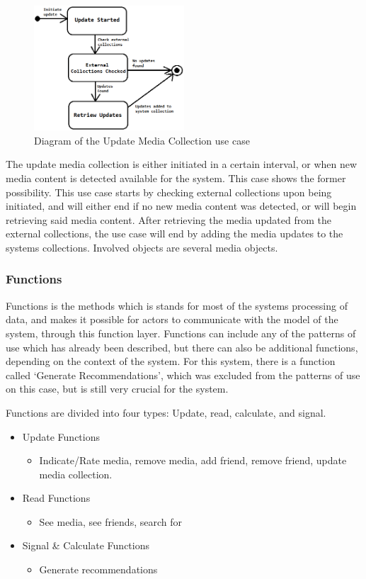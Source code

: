 \begin{figure}[htb]
\centering
\includegraphics[width=0.5\textwidth]{Images/UpdateCollection.png}
\caption{Diagram of the Update Media Collection use case}
\label{UpdateCollection}
\end{figure}

The update media collection is either initiated in a certain interval, or when new media content is detected available for the system. This case shows the former possibility. This use case starts by checking external collections upon being initiated, and will either end if no new media content was detected, or will begin retrieving said media content. After retrieving the media updated from the external collections, the use case will end by adding the media updates to the systems collections. Involved objects are several media objects.

\subsubsection{Functions}

Functions is the methods which is stands for most of the systems processing of data, and makes it possible for actors to communicate with the model of the system, through this function layer. Functions can include any of the patterns of use which has already been described, but there can also be additional functions, depending on the context of the system. For this system, there is a function called ‘Generate Recommendations’, which was excluded from the patterns of use on this case, but is still very crucial for the system. 

Functions are divided into four types: Update, read, calculate, and signal.
\begin{itemize}
	\item Update Functions
	\begin{itemize}
		\item Indicate/Rate media, remove media, add friend, remove friend, update media collection.
	\end{itemize}
	\item Read Functions
	\begin{itemize}
		\item See media, see friends, search for
	\end{itemize}
	\item Signal \& Calculate Functions
	\begin{itemize}
		\item Generate recommendations
	\end{itemize}
\end{itemize}

